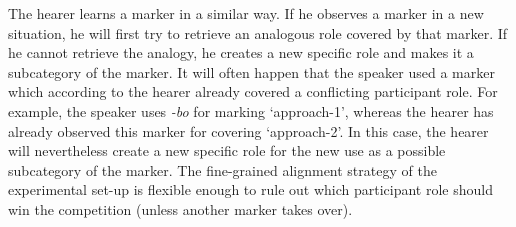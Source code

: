 The hearer learns a marker in a similar way. If he observes a marker in a new situation, he will first try to retrieve an analogous role covered by that marker. If he cannot retrieve the analogy, he creates a new specific role and makes it a subcategory of the marker. It will often happen that the speaker used a marker which according to the hearer already covered a conflicting participant role. For example, the speaker uses {\em -bo} for marking `approach-1', whereas the hearer has already observed this marker for covering `approach-2'. In this case, the hearer will nevertheless create a new specific role for the new use as a possible subcategory of the marker. The fine-grained alignment strategy of the experimental set-up is flexible enough to rule out which participant role should win the competition (unless another marker takes over).

